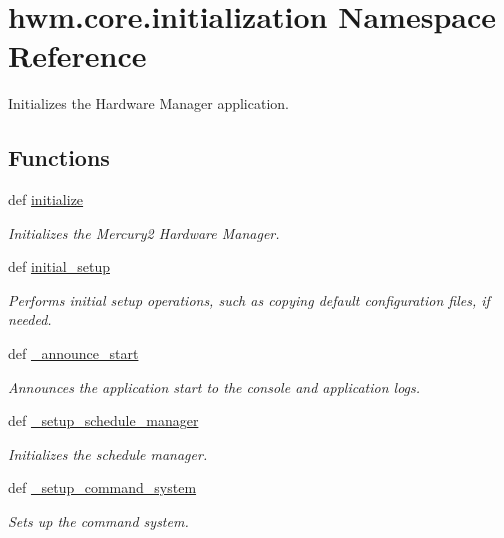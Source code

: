\hypertarget{namespacehwm_1_1core_1_1initialization}{\section{hwm.\-core.\-initialization Namespace Reference}
\label{namespacehwm_1_1core_1_1initialization}
}


Initializes the Hardware Manager application.  


\subsection*{Functions}
\begin{DoxyCompactItemize}
\item 
def \hyperlink{namespacehwm_1_1core_1_1initialization_ae81383c152b341507c55ef3cb8cf7123}{initialize}
\begin{DoxyCompactList}\small\item\em Initializes the Mercury2 Hardware Manager. \end{DoxyCompactList}\item 
def \hyperlink{namespacehwm_1_1core_1_1initialization_ab8054cf6f538212144b23d438b7085e1}{initial\-\_\-setup}
\begin{DoxyCompactList}\small\item\em Performs initial setup operations, such as copying default configuration files, if needed. \end{DoxyCompactList}\item 
def \hyperlink{namespacehwm_1_1core_1_1initialization_a62ced24c378cf88e784d91d92854916a}{\-\_\-announce\-\_\-start}
\begin{DoxyCompactList}\small\item\em Announces the application start to the console and application logs. \end{DoxyCompactList}\item 
def \hyperlink{namespacehwm_1_1core_1_1initialization_a16a0129e75041b3926eccec7cd20b0ed}{\-\_\-setup\-\_\-schedule\-\_\-manager}
\begin{DoxyCompactList}\small\item\em Initializes the schedule manager. \end{DoxyCompactList}\item 
def \hyperlink{namespacehwm_1_1core_1_1initialization_a685bd251a5bed7e664212eb053c105c7}{\-\_\-setup\-\_\-command\-\_\-system}
\begin{DoxyCompactList}\small\item\em Sets up the command system. \end{DoxyCompactList}\item 

\end{DoxyCompactItemize}
